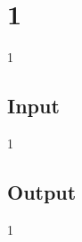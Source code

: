\documentclass{article}
\begin{document}
\section*{1}

1



\subsection*{Input}
1



\subsection*{Output}
1
\end{document}
